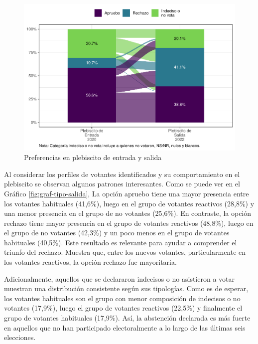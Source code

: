 \documentclass[
  12pt,
]{book}
\begin{document}
\begin{figure}

{\centering \includegraphics{reporte-elsoc_files/figure-latex/graf-alluvial-pleb-1} 

}

\caption{Preferencias en plebiscito de entrada y salida}\label{fig:graf-alluvial-pleb}
\end{figure}

Al considerar los perfiles de votantes identificados y su comportamiento en el plebiscito se observan algunos patrones interesantes. Como se puede ver en el Gráfico \ref{fig:graf-tipo-salida}, La opción apruebo tiene una mayor presencia entre los votantes habituales (41,6\%), luego en el grupo de votantes reactivos (28,8\%) y una menor presencia en el grupo de no votantes (25,6\%). En contraste, la opción rechazo tiene mayor presencia en el grupo de votantes reactivos (48,8\%), luego en el grupo de no votantes (42,3\%) y un poco menos en el grupo de votantes habituales (40,5\%). Este resultado es relevante para ayudar a comprender el triunfo del rechazo. Muestra que, entre los nuevos votantes, particularmente en los votantes reactivos, la opción rechazo fue mayoritaria.

Adicionalmente, aquellos que se declararon indecisos o no asistieron a votar muestran una distribución consistente según sus tipologías. Como es de esperar, los votantes habituales son el grupo con menor composición de indecisos o no votantes (17,9\%), luego el grupo de votantes reactivos (22,5\%) y finalmente el grupo de votantes habituales (17,9\%). Así, la abstención declarada es más fuerte en aquellos que no han participado electoralmente a lo largo de las últimas seis elecciones.
\end{document}

